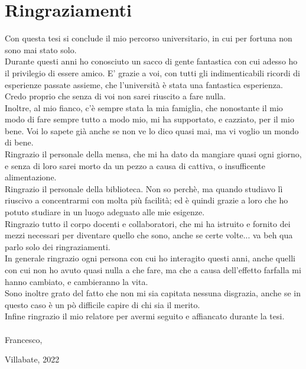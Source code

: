 \chapter*{Ringraziamenti}
	Con questa tesi si conclude il mio percorso universitario, in cui per fortuna non sono mai stato solo.\vspace{2mm}\\
	Durante questi anni ho conosciuto un sacco di gente fantastica con cui adesso ho il privilegio di essere amico. E' grazie a voi, con tutti gli indimenticabili ricordi di esperienze passate assieme, che l'università è stata una fantastica esperienza. Credo proprio che senza di voi non sarei riuscito a fare nulla.\vspace{2mm}\\
	Inoltre, al mio fianco, c'è sempre stata la mia famiglia, che nonostante il mio modo di fare sempre tutto a modo mio, mi ha supportato, e cazziato, per il mio bene. Voi lo sapete già anche se non ve lo dico quasi mai, ma vi voglio un mondo di bene.\vspace{2mm}\\
	Ringrazio il personale della mensa, che mi ha dato da mangiare quasi ogni giorno, e senza di loro sarei morto da un pezzo a causa di cattiva, o insufficente alimentazione.\vspace{2mm}\\
	Ringrazio il personale della biblioteca. Non so perchè, ma quando studiavo lì riuscivo a concentrarmi con molta più facilità; ed è quindi grazie a loro che ho potuto studiare in un luogo adeguato alle mie esigenze.\vspace{2mm}\\
	Ringrazio tutto il corpo docenti e collaboratori, che mi ha istruito e fornito dei mezzi necessari per diventare quello che sono, anche se certe volte... va beh qua parlo solo dei ringraziamenti.\vspace{2mm}\\
	In generale ringrazio ogni persona con cui ho interagito questi anni, anche quelli con cui non ho avuto quasi nulla a che fare, ma che a causa dell'effetto farfalla mi hanno cambiato, e cambieranno la vita.\vspace{2mm}\\
    Sono inoltre grato del fatto che non mi sia capitata nessuna disgrazia, anche se in questo caso è un pò difficile capire di chi sia il merito.\vspace{2mm}\\
	Infine ringrazio il mio relatore per avermi seguito e affiancato durante la tesi.\\\\
	
	Francesco,
	
	Villabate, 2022
	
	
